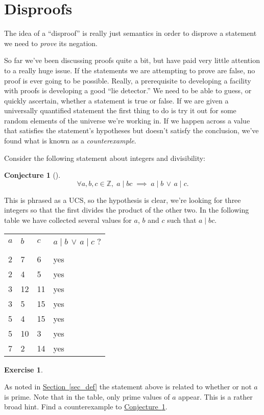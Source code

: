\documentclass[10pt,]{book}
\theoremstyle{plain}
\newtheorem{conjecture}[theorem]{Conjecture}
\theoremstyle{definition}
\theoremstyle{definition}
\newtheorem{exercise}[theorem]{Exercise}
\numberwithin{equation}{section}
\newcommand{\hrulethin}  {\noalign{\hrule height 0.04em}}
\newcommand{\divides}{\!\mid\!}
\newcommand{\Integers}{{\mathbb Z}}
\begin{document}
\typeout{************************************************}
\typeout{************************************************}
\section[{Disproofs}]{Disproofs}\label{sec_disproofs}

    The idea of a ``disproof'' is really just semantics \textemdash{} in order to
    disprove a statement we need to \emph{prove} its negation.
\par

    So far we've been discussing proofs quite a bit, but have paid
    very little attention to a really huge issue. If the statements
    we are attempting to prove are false, no proof is ever going to
    be possible. Really, a prerequisite to developing a facility with
    proofs is developing a good ``lie detector.'' We need to be able
    to guess, or quickly ascertain, whether a statement is true or false.
    If we are given a universally quantified statement the first thing to
    do is try it out for some random elements of the universe we're working
    in. If we happen across a value that satisfies the statement's hypotheses
    but doesn't satisfy the conclusion, we've found what is known as a
    \emph{counterexample}.
\par

    Consider the following statement about integers and divisibility:
\begin{conjecture}[{}]\label{conj_prim}
\begin{equation*}
      \forall a,b,c \in \Integers, \; a \divides bc \; \implies \; a \divides b \,
      \lor \, a \divides c.
    \end{equation*}\end{conjecture}
\par

    This is phrased as a UCS, so the hypothesis is clear, we're looking
    for three integers so that the first divides the product of the other
    two. In the following table we have collected several values for
    \(a\), \(b\) and \(c\) such that \(a \divides bc\).
\begin{tabular}{llll}
\(a\)&\(b\)&\(c\)&\(a \divides b \, \lor \, a \divides c\) ?\tabularnewline[0pt]
&&&\tabularnewline\hrulethin
2&7&6&yes\tabularnewline[0pt]
2&4&5&yes\tabularnewline[0pt]
3&12&11&yes\tabularnewline[0pt]
3&5&15&yes\tabularnewline[0pt]
5&4&15&yes\tabularnewline[0pt]
5&10&3&yes\tabularnewline[0pt]
7&2&14&yes
\end{tabular}
\begin{exercise}\label{exercise-21}

        As noted in \hyperref[sec_def]{Section~\ref{sec_def}} the statement above is related to
        whether or not \(a\) is prime. Note that in the table, only prime
        values of \(a\) appear. This is a rather broad hint. Find a
        counterexample to \hyperref[conj_prim]{Conjecture~\ref{conj_prim}}.
\end{exercise}
\par
\end{document}
